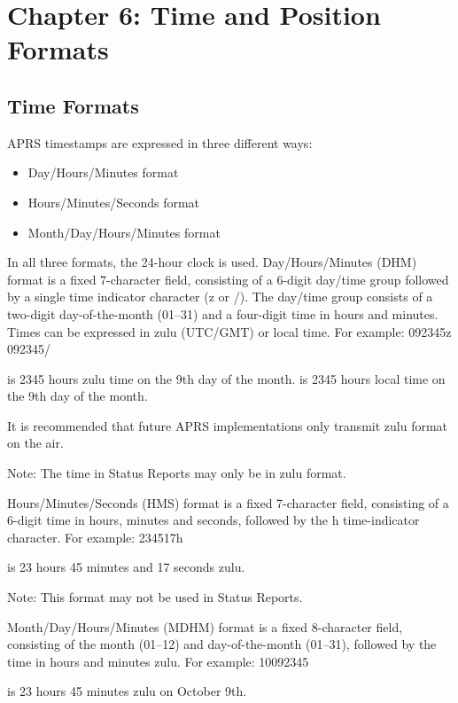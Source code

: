 \chapter{Chapter 6: Time and Position Formats}


\section{Time Formats}

APRS timestamps are expressed in three different ways:

\begin{itemize}

\item Day/Hours/Minutes format

\item Hours/Minutes/Seconds format

\item Month/Day/Hours/Minutes format


\end{itemize}

In all three formats, the 24-hour clock is used.
Day/Hours/Minutes (DHM) format is a fixed 7-character field, consisting of
a 6-digit day/time group followed by a single time indicator character (z or
/). The day/time group consists of a two-digit day-of-the-month (01–31) and
a four-digit time in hours and minutes.
Times can be expressed in zulu (UTC/GMT) or local time. For example:
092345z
092345/

is 2345 hours zulu time on the 9th day of the month.
is 2345 hours local time on the 9th day of the month.

It is recommended that future APRS implementations only transmit zulu
format on the air.

Note: The time in Status Reports may only be in zulu format.

Hours/Minutes/Seconds (HMS) format is a fixed 7-character field,
consisting of a 6-digit time in hours, minutes and seconds, followed by the h
time-indicator character. For example:
234517h

is 23 hours 45 minutes and 17 seconds zulu.

Note: This format may not be used in Status Reports.

Month/Day/Hours/Minutes (MDHM) format is a fixed 8-character field,
consisting of the month (01–12) and day-of-the-month (01–31), followed by
the time in hours and minutes zulu. For example:
10092345

is 23 hours 45 minutes zulu on October 9th.


